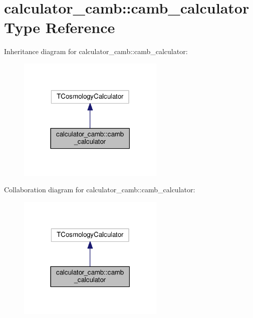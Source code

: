 \hypertarget{structcalculator__camb_1_1camb__calculator}{}\section{calculator\+\_\+camb\+:\+:camb\+\_\+calculator Type Reference}
\label{structcalculator__camb_1_1camb__calculator}


Inheritance diagram for calculator\+\_\+camb\+:\+:camb\+\_\+calculator\+:
\nopagebreak
\begin{figure}[H]
\begin{center}
\leavevmode
\includegraphics[width=198pt]{structcalculator__camb_1_1camb__calculator__inherit__graph}
\end{center}
\end{figure}


Collaboration diagram for calculator\+\_\+camb\+:\+:camb\+\_\+calculator\+:
\nopagebreak
\begin{figure}[H]
\begin{center}
\leavevmode
\includegraphics[width=198pt]{structcalculator__camb_1_1camb__calculator__coll__graph}
\end{center}
\end{figure}
